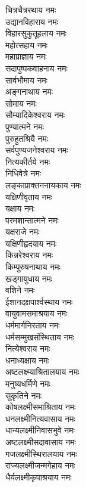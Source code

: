 \begin{multicols}{2}
\begin{flushleft}
चित्रचैत्ररथाय नमः\\
उद्यानविहाराय नमः\\
विहारसुकुतूहलाय नमः\\
महोत्सहाय नमः\\
महाप्राज्ञाय नमः\\
सदापुष्पकवाहनाय नमः\\
सार्वभौमाय नमः\\
अङ्गनाथाय नमः\\
सोमाय नमः\\
सौम्यादिकेश्वराय नमः\hfill{}\\ %
पुण्यात्मने नमः\\
पुरुहुतश्रियै नमः\\
सर्वपुण्यजनेश्वराय नमः\\
नित्यकीर्तये नमः\\
निधिवेत्रे नमः\\
लङ्काप्राक्तननायकाय नमः\\
यक्षिणीवृताय नमः\\
यक्षाय नमः\\
परमशान्तात्मने नमः\\
यक्षराजे नमः\hfill{}\\ %
यक्षिणीहृदयाय नमः\\ 
किन्नरेश्वराय नमः\\
किम्पुरुषनाथाय नमः\\
खड्गायुधाय नमः\\
वशिने नमः\\
ईशानदक्षपार्श्वस्थाय नमः\\
वायुवामसमाश्रयाय नमः\\
धर्ममार्गनिरताय नमः\\
धर्मसम्मुखसंस्थिताय नमः\\
नित्येश्वराय नमः\hfill{}\\ %
धनाध्यक्षाय नमः\\
अष्टलक्ष्म्याश्रितालयाय नमः\\
मनुष्यधर्मिणे नमः\\
सुकृतिने नमः\\
कोषलक्ष्मीसमाश्रिताय नमः\\
धनलक्ष्मीनित्यवासाय नमः\\
धान्यलक्ष्मीनिवासभुवे नमः\\
अष्टलक्ष्मीसदावासाय नमः\\
गजलक्ष्मीस्थिरालयाय नमः\\
राज्यलक्ष्मीजन्मगेहाय नमः\hfill{}\\ %
धैर्यलक्ष्मीकृपाश्रयाय नमः\\

\end{flushleft}
\end{multicols}
